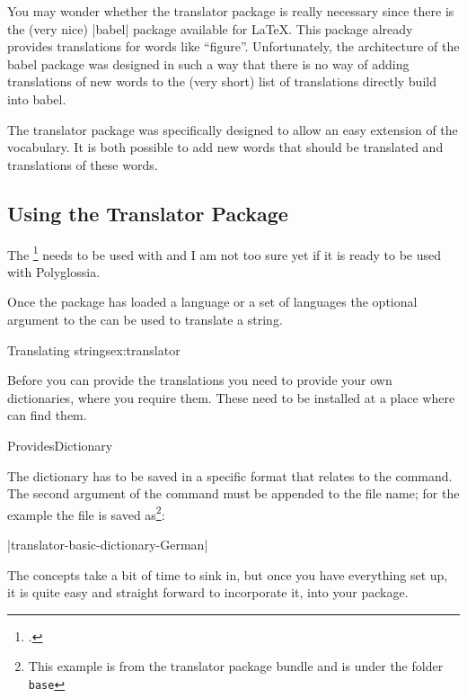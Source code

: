 You may wonder whether the translator package is really necessary
since there is the (very nice) |babel| package available for
\LaTeX. This package already provides translations for words like
``figure''. Unfortunately, the architecture of the babel package was
designed in such a way that there is no way of adding translations of
new words to the (very short) list of translations directly build into
babel.

The translator package was specifically designed to allow an easy
extension of the vocabulary. It is both possible to add new words that
should be translated and translations of these words.

\subsection{Using the Translator Package}

  The \footcite{translator} needs to be used with  and I am not too sure yet 
  if it is ready  to be used with Polyglossia.

Once the package has loaded a language or a set of languages the optional argument to the
\cmd{\translate} can be used to translate a string. 

\begin{texexample}{Translating strings}{ex:translator}
\end{texexample}

Before you can provide the translations you need to provide your own dictionaries, where you require them. These need to be installed at a place where \tex can find them.

\begin{docCmd} {ProvidesDictionary} {   }
\end{docCmd}

The dictionary has to be saved in a specific format that relates to the  command. The second argument of the command must be appended to the file name; for the example the file is saved as\footnote{This  example is from the translator package bundle and is under the folder \texttt{base}}:

|translator-basic-dictionary-German|

The concepts take a bit of time to sink in, but once you have everything set up, it is quite easy and straight forward to incorporate it, into your package. 

